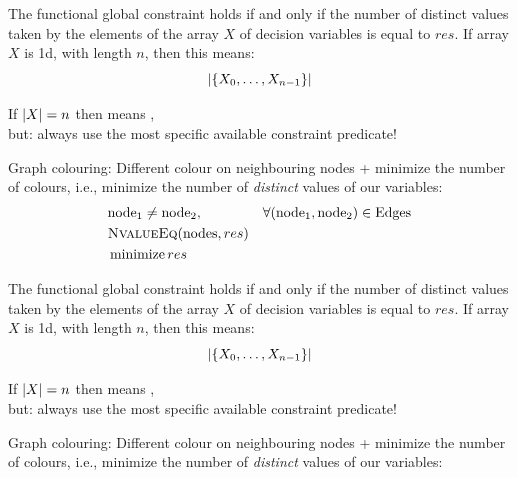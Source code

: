 \documentclass{cons-beamer}
\begin{document}
\begin{frame}
  \begin{definition}
    The  functional global constraint holds if and only if the number of distinct values taken by the elements of the array $X$ of decision variables is equal to $res$. If array $X$ is 1d, with length $n$, then this means:
    \[
      \left\lvert\left\{X_0,\dots,X_{n-1}\right\}\right\rvert
    \]
  \end{definition}
  \vfill

  If $\left\lvert X\right\rvert = n$ then  means , \\
  but: \alert{always use the most specific available constraint predicate!}
  \vfill

  \begin{example}
    Graph colouring: Different colour on neighbouring nodes + minimize the number of colours, i.e., minimize the number of \emph{distinct} values of our variables:
    \begin{align*}        
      &\text{node}_{1} \neq \text{node}_{2}, &\forall (\text{node}_1, \text{node}_2) \in \text{Edges} \\
      &\textsc{NvalueEq}(\text{nodes}, res) &\\
      &\operatorname*{minimize} res &
    \end{align*}
  \end{example}
\end{frame}

\begin{flashcardcpmpy}
\begin{frame}
  \begin{definition}
    The  functional global constraint holds if and only if the number of distinct values taken by the elements of the array $X$ of decision variables is equal to $res$. If array $X$ is 1d, with length $n$, then this means:
    \[
      \left\lvert\left\{X_0,\dots,X_{n-1}\right\}\right\rvert
    \]
  \end{definition}
  \vfill

  If $\left\lvert X\right\rvert = n$ then  means , \\
  but: \alert{always use the most specific available constraint predicate!}
  \vfill

  \begin{example}
    Graph colouring: Different colour on neighbouring nodes + minimize the number of colours, i.e., minimize the number of \emph{distinct} values of our variables:
    
  \end{example}
\end{frame}
\end{flashcardcpmpy}
\end{document}
